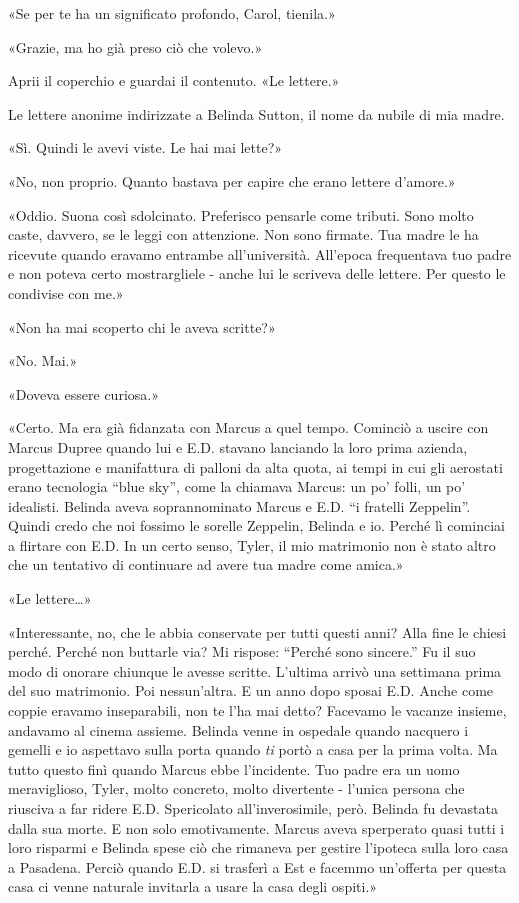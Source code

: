 «Se per te ha un significato profondo, Carol, tienila.»

«Grazie, ma ho già preso ciò che volevo.»

Aprii il coperchio e guardai il contenuto. «Le lettere.»

Le lettere anonime indirizzate a Belinda Sutton, il nome da nubile di
mia madre.

«Sì. Quindi le avevi viste. Le hai mai lette?»

«No, non proprio. Quanto bastava per capire che erano lettere d'amore.»

«Oddio. Suona così sdolcinato. Preferisco pensarle come tributi. Sono
molto caste, davvero, se le leggi con attenzione. Non sono firmate. Tua
madre le ha ricevute quando eravamo entrambe all'università. All'epoca
frequentava tuo padre e non poteva certo mostrargliele - anche lui le
scriveva delle lettere. Per questo le condivise con me.»

«Non ha mai scoperto chi le aveva scritte?»

«No. Mai.»

«Doveva essere curiosa.»

«Certo. Ma era già fidanzata con Marcus a quel tempo. Cominciò a uscire
con Marcus Dupree quando lui e E.D. stavano lanciando la loro prima
azienda, progettazione e manifattura di palloni da alta quota, ai tempi
in cui gli aerostati erano tecnologia ``blue sky'', come la chiamava
Marcus: un po' folli, un po' idealisti. Belinda aveva soprannominato
Marcus e E.D. ``i fratelli Zeppelin''. Quindi credo che noi fossimo le
sorelle Zeppelin, Belinda e io. Perché lì cominciai a flirtare con E.D.
In un certo senso, Tyler, il mio matrimonio non è stato altro che un
tentativo di continuare ad avere tua madre come amica.»

«Le lettere\ldots»

«Interessante, no, che le abbia conservate per tutti questi anni? Alla
fine le chiesi perché. Perché non buttarle via? Mi rispose: ``Perché
sono sincere.'' Fu il suo modo di onorare chiunque le avesse scritte.
L'ultima arrivò una settimana prima del suo matrimonio. Poi
nessun'altra. E un anno dopo sposai E.D. Anche come coppie eravamo
inseparabili, non te l'ha mai detto? Facevamo le vacanze insieme,
andavamo al cinema assieme. Belinda venne in ospedale quando nacquero i
gemelli e io aspettavo sulla porta quando \emph{ti} portò a casa per la
prima volta. Ma tutto questo finì quando Marcus ebbe l'incidente. Tuo
padre era un uomo meraviglioso, Tyler, molto concreto, molto divertente
- l'unica persona che riusciva a far ridere E.D. Spericolato
all'inverosimile, però. Belinda fu devastata dalla sua morte. E non solo
emotivamente. Marcus aveva sperperato quasi tutti i loro risparmi e
Belinda spese ciò che rimaneva per gestire l'ipoteca sulla loro casa a
Pasadena. Perciò quando E.D. si trasferì a Est e facemmo un'offerta per
questa casa ci venne naturale invitarla a usare la casa degli ospiti.»

